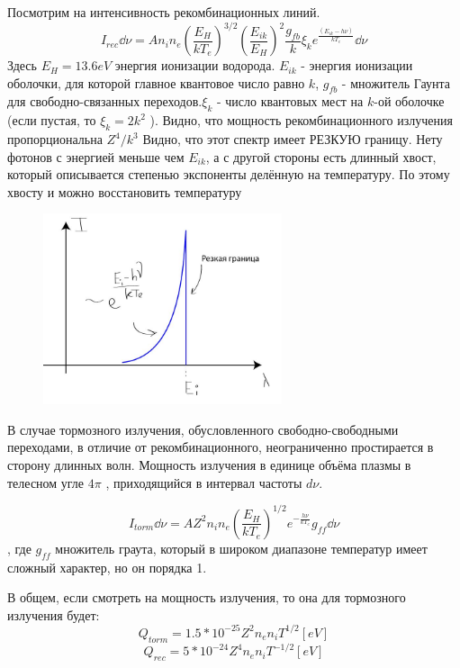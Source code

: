 \documentclass[10pt, a4paper]{article}
\begin{document}
Посмотрим на интенсивность рекомбинационных линий.
\begin{equation}
	I_{rec} \dd\nu = A n_i n_e (\frac{E_H}{kT_e})^{3/2} (\frac{E_{ik}}{E_H})^{2} \frac{g_{fb}}{k} \xi_k e^{\frac{(E_{ik}-h \nu)}{kT_e}} \dd\nu 
\end{equation}
Здесь $E_H = 13.6 eV$ энергия ионизации водорода. $E_{ik}$ - энергия ионизации оболочки, для которой главное квантовое число равно $k$, $g_{fb}$ - множитель Гаунта для свободно-связанных переходов.$ \xi_k$ - число квантовых мест на $k$-ой оболочке (если пустая, то $ \xi_k = 2k^{2}$ ). 
Видно, что мощность рекомбинационного излучения пропорциональна $Z^{4}/k^3$
Видно, что этот спектр имеет РЕЗКУЮ границу. Нету фотонов с энергией меньше чем $E_{ik}$, а с другой стороны есть длинный хвост, который описывается степенью экспоненты делённую на температуру. По этому хвосту и можно восстановить температуру

\begin{figure}[h!]
	\begin{center}
		\includegraphics[width=70mm]{Intencity_recomb.JPG}
	\end{center}
\end{figure}

В случае тормозного излучения, обусловленного свободно-свободными переходами, в отличие от рекомбинационного, неограниченно простирается в сторону длинных волн. Мощность излучения в единице объёма плазмы в телесном угле $4 \pi$ , приходящийся в интервал частоты $d\nu$.

\begin{equation}
	I_{torm} \dd\nu = A Z^{2} n_i n_e (\frac{E_H}{kT_e})^{1/2} e^{-\frac{h \nu}{kT_e}} g_{ff} \dd\nu
\end{equation}
, где $g_{ff}$ множитель граута, который в широком диапазоне температур имеет сложный характер, но он порядка 1.

В общем, если смотреть на мощность излучения, то она для тормозного излучения будет:
\begin{equation}
	Q_{torm}=1.5 *10^{-25} Z^{2} n_e n_i T^{1/2}[eV]
\end{equation}
\begin{equation}
	Q_{rec}=5 *10^{-24} Z^{4} n_e n_i T^{-1/2}[eV]
\end{equation}
\end{document}
